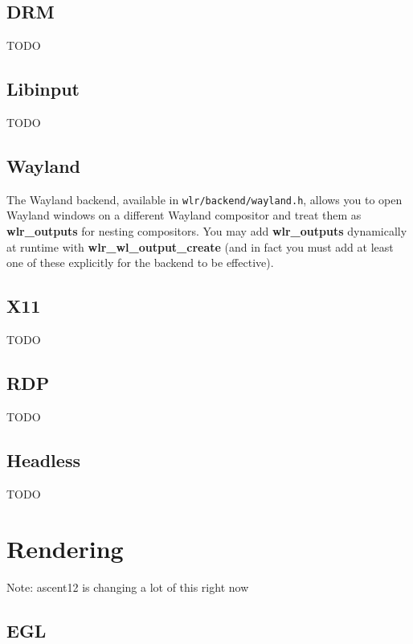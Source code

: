\documentclass{article}
\newcommand{\code}[1]{\texttt{#1}}
\begin{document}
\subsection{DRM}\label{drm backend}

TODO

\subsection{Libinput}\label{libinput backend}

TODO

\subsection{Wayland}\label{wl backend}

The Wayland backend, available in \code{wlr/backend/wayland.h}, allows you to
open Wayland windows on a different Wayland compositor and treat them as
\textbf{wlr_outputs} for nesting compositors. You may add \textbf{wlr_outputs}
dynamically at runtime with \textbf{wlr_wl_output_create} (and in fact you must
add at least one of these explicitly for the backend to be effective).

\subsection{X11}\label{x11 backend}

TODO

\subsection{RDP}\label{rdp backend}

TODO

\subsection{Headless}\label{headless backend}

TODO

\newpage
\section{Rendering}\label{rendering}

Note: ascent12 is changing a lot of this right now

\subsection{EGL}
\end{document}
